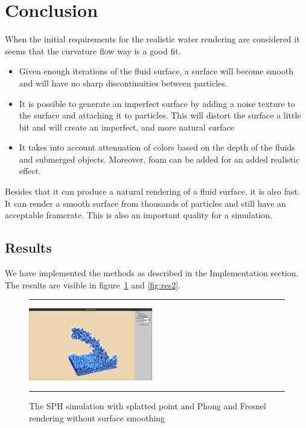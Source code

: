 
\section{Conclusion}
When the initial requirements for the realistic water rendering are considered it seems that the curvature flow way is a good fit.
\begin{itemize}
\item Given enough iterations of the fluid surface, a surface will become smooth and will have no sharp discontinuities between particles.
\item It is possible to generate an imperfect surface by adding a noise texture to the surface and attaching it to particles. This will distort the surface a little bit and will create an imperfect, and more natural surface
\item It takes into account attenuation of colors based on the depth of the fluids and submerged objects. Moreover, foam can be added for an added realistic effect.
\end{itemize}
Besides that it can produce a natural rendering of a fluid surface, it is also fast. 
It can render a smooth surface from thousands of particles and still have an acceptable framerate. 
This is also an important quality for a simulation.

\subsection{Results}

We have implemented the methods as described in the Implementation section.
The results are visible in figure~\ref{fig:res} and \ref{fig:res2}.

\begin{figure}[!th]
\hrule
\begin{center}
\vspace*{2ex}\includegraphics[width=0.48\textwidth,clip=true,trim=10cm 1cm 10cm 5cm]{pictures/colors_unsmoothed.png}
\end{center}
\caption{The SPH simulation with splatted point and Phong and Fresnel rendering without surface smoothing}
\label{fig:res} 
\vspace*{2ex}
\hrule
\end{figure}


